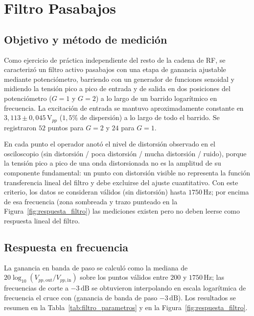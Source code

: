 \documentclass[12pt, a4paper, twoside]{report}
\begin{document}
\chapter{Filtro Pasabajos}
\label{ch:filtro}

\section{Objetivo y método de medición}
\label{sec:filtro_metodo}

Como ejercicio de práctica independiente del resto de la cadena de
RF, se caracterizó un filtro activo pasabajos con una etapa de
ganancia ajustable mediante potenciómetro, barriendo con un generador
de funciones senoidal y midiendo la tensión pico a pico de entrada y
de salida en dos posiciones del potenciómetro ($G=1$ y $G=2$) a lo
largo de un barrido logarítmico en frecuencia. La excitación de
entrada se mantuvo aproximadamente constante en
$3{,}113 \pm 0{,}045\,\text{V}_{pp}$ ($1{,}5\%$ de dispersión) a lo
largo de todo el barrido. Se registraron $52$ puntos para $G=2$ y
$24$ para $G=1$.

En cada punto el operador anotó el nivel de distorsión observado en
el osciloscopio (sin distorsión / poca distorsión / mucha distorsión
/ ruido), porque la tensión pico a pico de una onda distorsionada no
es la amplitud de su componente fundamental: un punto con distorsión
visible no representa la función transferencia lineal del filtro y
debe excluirse del ajuste cuantitativo. Con este criterio, los datos
se consideran válidos (sin distorsión) hasta $1750\,\text{Hz}$; por
encima de esa frecuencia (zona sombreada y trazo punteado en la
Figura~\ref{fig:respuesta_filtro}) las mediciones existen pero no
deben leerse como respuesta lineal del filtro.

\section{Respuesta en frecuencia}
\label{sec:filtro_respuesta}

La ganancia en banda de paso se calculó como la mediana de
$20\log_{10}(V_{pp,\text{out}}/V_{pp,\text{in}})$ sobre los puntos
válidos entre $200$ y $1750\,\text{Hz}$; las frecuencias de corte a
$-3\,\text{dB}$ se obtuvieron interpolando en escala logarítmica de
frecuencia el cruce con (ganancia de banda de paso $-3\,\text{dB}$).
Los resultados se resumen en la Tabla~\ref{tab:filtro_parametros} y
en la Figura~\ref{fig:respuesta_filtro}.
\end{document}
